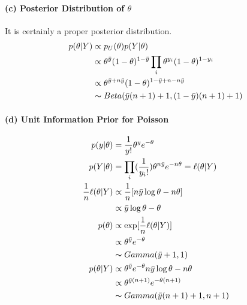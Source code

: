 \documentclass[11pt, letterpaper]{article}
\begin{document}
\paragraph{(c) Posterior Distribution of $\theta$}
It is certainly a proper posterior distribution.
\begin{align*}
    p(\theta|Y) &\propto p_U(\theta) p(Y|\theta) \\
        &\propto \theta^{\bar{y}} (1-\theta)^{1-\bar{y}} \prod_i \theta^{y_i}(1-\theta)^{1-y_i} \\
        &\propto \theta^{\bar{y}+n\bar{y}} (1-\theta)^{1-\bar{y}+n-n\bar{y}} \\
        &\thicksim Beta(\bar{y}(n+1)+1, (1-\bar{y})(n+1)+1)
\end{align*}

\paragraph{(d) Unit Information Prior for Poisson}
\begin{align*}
    p(y|\theta) &= \frac{1}{y!}\theta^y e^{-\theta} \\
    p(Y|\theta) &= \prod_i(\frac{1}{y_i!})\theta^{n\bar{y}} e^{-n\theta} = \ell(\theta|Y) \\
    \frac{1}{n} \ell(\theta|Y) &\propto \frac{1}{n}[n\bar{y}\log\theta - n\theta] \\
        &\propto \bar{y}\log\theta - \theta \\
    p(\theta) &\propto \exp[\frac{1}{n} \ell(\theta|Y)] \\
        &\propto \theta^{\bar{y}} e^{-\theta} \\
        &\thicksim Gamma(\bar{y}+1, 1) \\
    p(\theta|Y) &\propto \theta^{\bar{y}} e^{-\theta} n\bar{y}\log\theta - n\theta \\
        &\propto \theta^{\bar{y}(n+1)} e^{-\theta(n+1)} \\
        &\thicksim Gamma(\bar{y}(n+1)+1, n+1)
\end{align*}
\end{document}
